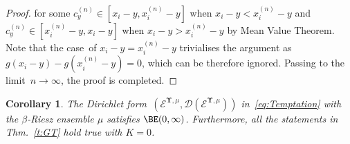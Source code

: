 \documentclass[11pt,letterpaper]{amsart}
\newcommand{\dom}[1]{\mathcal D(#1)}
\newcommand{\N}{{\mathbb N}}
\newcommand{\comma}{\,\,\mathrm{,}\;\,}
\newcommand{\fstop}{\,\,\mathrm{.}}
\newcommand{\purple}[1]{{\color{purple}#1}}
\newcommand{\QP}{{\mu}}
\newcommand{\dUpsilon}{{\mathbf \Upsilon}}
\newcommand{\U}{\dUpsilon}
\newcommand{\E}{\mathcal E}
\renewcommand{\1}{\mathbf 1}
\numberwithin{equation}{section}
\theoremstyle{plain}
\newtheorem{cor}[thm]{Corollary}%
\theoremstyle{definition}
\theoremstyle{remark}
\begin{document}
\begin{proof}
for some $c^{(n)}_y \in [x_i-y, x_i^{(n)}-y]$ when $x_i-y <x_i^{(n)}-y$ and $c^{(n)}_y \in [x_i^{(n)}-y, x_i-y]$ when $x_i-y > x_i^{(n)}-y$ by Mean Value Theorem. Note that the case~of $x_i-y =x_i^{(n)}-y$ trivialises the argument as $g(x_i-y)-g(x_i^{(n)}-y)=0$, which can be therefore ignored. Passing to the limit~$n \to \infty$, the proof is completed. 
\end{proof}
\begin{cor}\label{c:BRE}
The Dirichlet form~$(\E^{\U, \QP}, \dom{\E^{\U, \QP}})$  in~\eqref{eq:Temptation} with the $\beta$-Riesz ensemble $\QP$ satisfies $\BE(0,\infty)$. Furthermore, all the statements in Thm.~\ref{t:GT} hold true with $K=0$. 
\end{cor}
\end{document}
